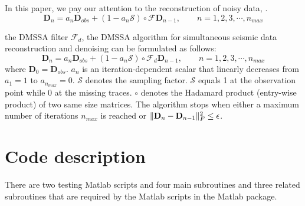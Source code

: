 In this paper, we pay our attention to the reconstruction of noisy data, . 
\begin{equation}
\label{eq:mssapocs}
\mathbf{D}_n=a_n \mathbf{D}_{obs} + (1-a_n\mathcal{S})\circ \mathcal{F}\mathbf{D}_{n-1},\qquad n=1,2,3,\cdots,n_{max}
\end{equation}


  the DMSSA filter $\mathcal{F}_d$,  the  DMSSA algorithm for simultaneous seismic data reconstruction and denoising can be formulated as follows:
\begin{equation}
\label{eq:dmssapocs}
\mathbf{D}_n=a_n \mathbf{D}_{obs} + (1-a_n\mathcal{S})\circ \mathcal{F}_d\mathbf{D}_{n-1},\qquad n=1,2,3,\cdots,n_{max}
\end{equation}
where $\mathbf{D}_0=\mathbf{D}_{obs}$. $a_n$ is an iteration-dependent scalar that linearly decreases from $a_1=1$ to $a_{n_{max}}=0$. $\mathcal{S}$ denotes the sampling factor. $\mathcal{S}$ equals 1 at the observation point while 0 at the missing traces. $\circ$ denotes the Hadamard product (entry-wise product) of two same size matrices. The algorithm stops when either a maximum number of iterations $n_{max}$ is reached or $\Arrowvert \mathbf{D}_n - \mathbf{D}_{n-1}\Arrowvert_F^2 \leq \epsilon$.


\section{Code description}
There are two testing Matlab scripts and four main subroutines and three related subroutines that are required by the Matlab scripts in the Matlab package. 

